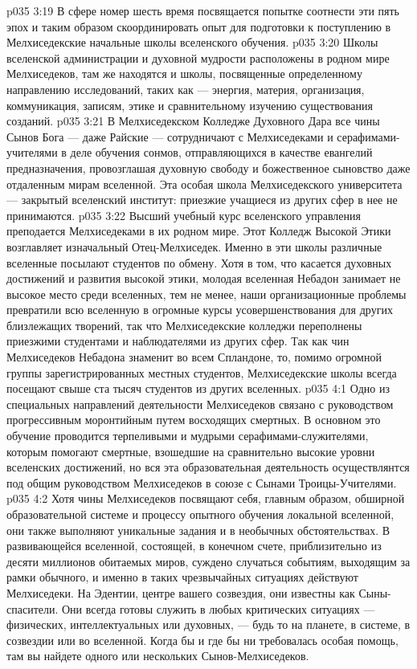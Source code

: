 \vs p035 3:19 \pc {}\bibnobreakspace В сфере номер шесть время посвящается попытке соотнести эти пять эпох и таким образом скоординировать опыт для подготовки к поступлению в Мелхиседекские начальные школы вселенского обучения.
\vs p035 3:20 \pc Школы вселенской администрации и духовной мудрости расположены в родном мире Мелхиседеков, там же находятся и школы, посвященные определенному направлению исследований, таких как --- энергия, материя, организация, коммуникация, записям, этике и сравнительному изучению существования созданий.
\vs p035 3:21 В Мелхиседекском Колледже Духовного Дара все чины Сынов Бога --- даже Райские --- сотрудничают с Мелхиседеками и серафимами\hyp{}учителями в деле обучения сонмов, отправляющихся в качестве евангелий предназначения, провозглашая духовную свободу и божественное сыновство даже отдаленным мирам вселенной. Эта особая школа Мелхиседекского университета --- закрытый вселенский институт: приезжие учащиеся из других сфер в нее не принимаются.
\vs p035 3:22 Высший учебный курс вселенского управления преподается Мелхиседеками в их родном мире. Этот Колледж Высокой Этики возглавляет изначальный Отец\hyp{}Мелхиседек. Именно в эти школы различные вселенные посылают студентов по обмену. Хотя в том, что касается духовных достижений и развития высокой этики, молодая вселенная Небадон занимает не высокое место среди вселенных, тем не менее, наши организационные проблемы превратили всю вселенную в огромные курсы усовершенствования для других близлежащих творений, так что Мелхиседекские колледжи переполнены приезжими студентами и наблюдателями из других сфер. Так как чин Мелхиседеков Небадона знаменит во всем Спландоне, то, помимо огромной группы зарегистрированных местных студентов, Мелхиседекские школы всегда посещают свыше ста тысяч студентов из других вселенных.
\vs p035 4:1 Одно из специальных направлений деятельности Мелхиседеков связано с руководством прогрессивным моронтийным путем восходящих смертных. В основном это обучение проводится терпеливыми и мудрыми серафимами\hyp{}служителями, которым помогают смертные, взошедшие на сравнительно высокие уровни вселенских достижений, но вся эта образовательная деятельность осуществлянтся под общим руководством Мелхиседеков в союзе с Сынами Троицы\hyp{}Учителями.
\vs p035 4:2 \pc Хотя чины Мелхиседеков посвящают себя, главным образом, обширной образовательной системе и процессу опытного обучения локальной вселенной, они также выполняют уникальные задания и в необычных обстоятельствах. В развивающейся вселенной, состоящей, в конечном счете, приблизительно из десяти миллионов обитаемых миров, суждено случаться событиям, выходящим за рамки обычного, и именно в таких чрезвычайных ситуациях действуют Мелхиседеки. На Эдентии, центре вашего созвездия, они известны как Сыны\hyp{}спасители. Они всегда готовы служить в любых критических ситуациях --- физических, интеллектуальных или духовных, --- будь то на планете, в системе, в созвездии или во вселенной. Когда бы и где бы ни требовалась особая помощь, там вы найдете одного или нескольких Сынов\hyp{}Мелхиседеков.
